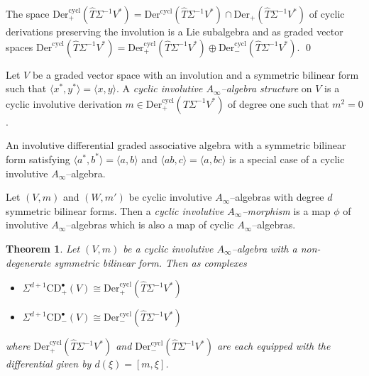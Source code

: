 \documentclass[british]{amsart}
\theoremstyle{plain}
\newtheorem{theorem}{Theorem}[section]
\theoremstyle{definition}
{
\newaliascnt{{definition}}{theorem}\newtheorem{{definition}}[{definition}]{{Definition}}\aliascntresetthe{{definition}}\expandafterautorefname\endcsname{{Definition}}}
{
\newaliascnt{{remark}}{theorem}\newtheorem{{remark}}[{remark}]{{Remark}}\aliascntresetthe{{remark}}\expandafterautorefname\endcsname{{Remark}}}
{
\newaliascnt{{example}}{theorem}\newtheorem{{example}}[{example}]{{Example}}\aliascntresetthe{{example}}\expandafterautorefname\endcsname{{Example}}}
{
\newaliascnt{{examples}}{theorem}\newtheorem{{examples}}[{examples}]{{Examples}}\aliascntresetthe{{examples}}\expandafterautorefname\endcsname{{Examples}}}
{
\newaliascnt{{notation}}{theorem}\newtheorem{{notation}}[{notation}]{{Notation}}\aliascntresetthe{{notation}}\expandafterautorefname\endcsname{{Notation}}}
{
\newaliascnt{{convention}}{theorem}\newtheorem{{convention}}[{convention}]{{Convention}}\aliascntresetthe{{convention}}\expandafterautorefname\endcsname{{Convention}}}
\numberwithin{equation}{section}
\numberwithin{figure}{section}
\begin{document}
\begin{corollary}
The space ${\mathrm{Der}}^{\mathrm{cycl}}_+(\widehat{T}\Sigma^{-1}V^*)={\mathrm{Der}}^{\mathrm{cycl}}(\widehat{T}\Sigma^{-1}V^*)\cap{\mathrm{Der}}_+(\widehat{T}\Sigma^{-1}V^*)$ of cyclic derivations preserving the involution is a Lie subalgebra and as graded vector spaces ${\mathrm{Der}}^{\mathrm{cycl}}(\widehat{T}\Sigma^{-1}V^*) = {\mathrm{Der}}^{\mathrm{cycl}}_+(\widehat{T}\Sigma^{-1}V^*)\oplus{\mathrm{Der}}^{\mathrm{cycl}}_-(\widehat{T}\Sigma^{-1}V^*)$.
\qed
\end{corollary}

\begin{definition}
Let $V$ be a graded vector space with an involution and a symmetric bilinear form such that $\langle x^*, y^* \rangle = \langle x, y \rangle$. A \emph{cyclic involutive $A_\infty$--algebra structure} on $V$ is a cyclic involutive derivation $m \in {\mathrm{Der}}^{\mathrm{cycl}}_+(\widehat{T} \Sigma^{-1} V^*)$ of degree one such that $m^2 = 0$.
\end{definition}

\begin{remark}
An involutive differential graded associative algebra with a symmetric bilinear form satisfying $\langle a^*, b^* \rangle = \langle a, b \rangle$ and $\langle ab, c \rangle = \langle a, bc \rangle$ is a special case of a cyclic involutive $A_\infty$--algebra.
\end{remark}

\begin{definition}
Let $(V,m)$ and $(W,m')$ be cyclic involutive $A_\infty$--algebras with degree $d$ symmetric bilinear forms. Then a \emph{cyclic involutive $A_\infty$--morphism} is a map $\phi$ of involutive $A_\infty$--algebras which is also a map of cyclic $A_\infty$--algebras.
\end{definition}

\begin{theorem}
Let $(V, m)$ be a cyclic involutive $A_\infty$--algebra with a \emph{non-degenerate} symmetric bilinear form. Then as complexes
\begin{itemize}
\item $\Sigma^{d+1}{\mathrm{CD}}^\bullet_+(V) \cong {\mathrm{Der}}^{\mathrm{cycl}}_+(\widehat{T} \Sigma^{-1} V^*)$
\item $\Sigma^{d+1}{\mathrm{CD}}^\bullet_-(V) \cong {\mathrm{Der}}^{\mathrm{cycl}}_-(\widehat{T} \Sigma^{-1} V^*)$
\end{itemize}
where ${\mathrm{Der}}^{\mathrm{cycl}}_+(\widehat{T} \Sigma^{-1} V^*)$ and ${\mathrm{Der}}^{\mathrm{cycl}}_-(\widehat{T} \Sigma^{-1} V^*)$ are each equipped with the differential given by $d(\xi)=[m,\xi]$.
\end{theorem}
\end{document}
